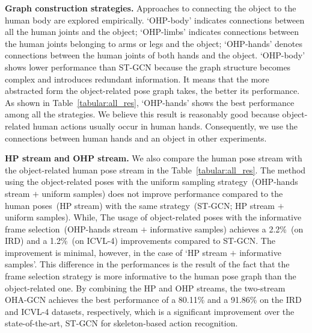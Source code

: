 \documentclass[10pt,twocolumn,letterpaper]{article}
\begin{document}
\textbf{Graph construction strategies.} 
Approaches to connecting the object to the human body are explored empirically. `OHP-body' indicates connections between all the human joints and the object; `OHP-limbs' indicates connections between the human joints belonging to arms or legs and the object; `OHP-hands' denotes connections between the human joints of both hands and the object.
`OHP-body' shows lower performance than ST-GCN because the graph structure becomes complex and introduces redundant information.
It means that the more abstracted form the object-related pose graph takes, the better its performance.
As shown in Table~\ref{tabular:all_res}, `OHP-hands' shows the best performance among all the strategies.
We believe this result is reasonably good because object-related human actions usually occur in human hands. 
Consequently, we use the connections between human hands and an object in other experiments.


\textbf{HP stream and OHP stream.} 
We also compare the human pose stream with the object-related human pose stream in the Table~\ref{tabular:all_res}. 
The method using the object-related poses with the uniform sampling strategy~(OHP-hands stream $+$ uniform samples) does not improve performance compared to the human poses~(HP stream) with the same strategy~(ST-GCN; HP stream $+$ uniform samples).
While, 
The usage of object-related poses with the informative frame selection~(OHP-hands stream $+$ informative samples) achieves a 2.2\%~(on IRD) and a 1.2\%~(on ICVL-4) improvements compared to ST-GCN. The improvement is minimal, however, in the case of `HP stream $+$ informative samples'.
This difference in the performances is the result of the fact that the frame selection strategy is more informative to the human pose graph than the object-related one. By combining the HP and OHP streams, the two-stream OHA-GCN 
achieves the best performance of a 80.11\% and a 91.86\% on the IRD and ICVL-4 datasets, respectively, which 
is a significant improvement over the state-of-the-art, ST-GCN for skeleton-based action recognition.
\end{document}
